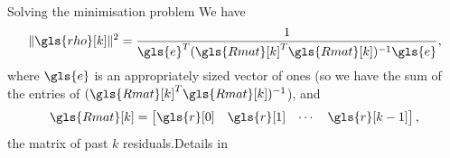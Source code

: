 \documentclass[aspectratio=169]{beamer}
\begin{document}
\begin{frame}{Solving the minimisation problem}
    We have 
    \begin{equation}\label{eqn:rhonorm}
        \|\gls{rho}[k]\|^2 = \frac{1}{\gls{e}^T(\gls{Rmat}[k]^T\gls{Rmat}[k])^{-1}\gls{e}},
    \end{equation}
    where $\gls{e}$ is an appropriately sized vector of ones (so we have the sum of the
    entries of $(\gls{Rmat}[k]^T\gls{Rmat}[k])^{-1}$), and
    \begin{equation}\gls{Rmat}[k] = \begin{bmatrix}
        \gls{r}[0] & \gls{r}[1] & \cdots & \gls{r}[k-1]
    \end{bmatrix},
    \end{equation}
    the matrix of past $k$ residuals.\hfill  {\footnotesize Details in \parencite{Ni2009}}

\end{frame}
\end{document}
